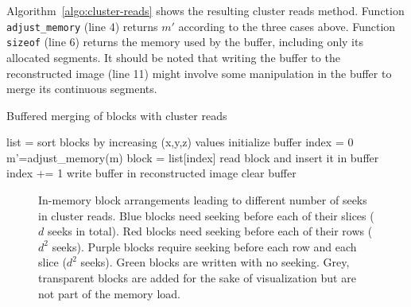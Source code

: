 \documentclass[10pt, conference, compsocconf]{IEEEtran}
\begin{document}
Algorithm~\ref{algo:cluster-reads} shows the resulting cluster reads
method. Function \texttt{adjust\_memory} (line 4) returns $m'$
according to the three cases above. Function \texttt{sizeof} (line 6)
returns the memory used by the buffer, including only its allocated
segments. It should be noted that writing the buffer to the
reconstructed image (line 11) might involve some manipulation in the
buffer to merge its continuous segments. 
\begin{algorithm}[h]
  \caption{Buffered merging of blocks with cluster reads}
  \label{algo:cluster-reads}
  \begin{algorithmic}[1]
    \STATE list = sort blocks by increasing (x,y,z) values
    \STATE initialize buffer
    \STATE index = 0
    \STATE m'=adjust\_memory(m)    
        \STATE block = list[index]
        \STATE read block and insert it in buffer
        \STATE index += 1
        \ENDWHILE
       \STATE write buffer in reconstructed image
       \STATE clear buffer
    \ENDWHILE
  \end{algorithmic}
\end{algorithm}



\begin{figure}
\centering
\def\svgwidth{0.3\columnwidth}

\def\svgwidth{0.3\columnwidth}

\def\svgwidth{0.3\columnwidth}

\def\svgwidth{0.3\columnwidth}

\def\svgwidth{0.3\columnwidth}

\def\svgwidth{0.3\columnwidth}


\caption{In-memory block arrangements leading to different number of
  seeks in cluster reads. Blue blocks need seeking before each of
  their slices ($d$ seeks in total). Red blocks need seeking before
  each of their rows ($d^2$ seeks). Purple blocks require seeking
  before each row and each slice ($d^2$ seeks). Green blocks are
  written with no seeking. Grey, transparent blocks are added for the sake of
  visualization but are not part of the memory load.}
\label{fig:cluster-reads}
\end{figure}
\end{document}
